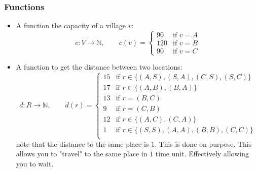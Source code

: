         \subsubsection{Functions}        
            \begin{itemize}
                \item 
                    A function the capacity of a village $v$:
                    \[
                        c : V \to \mathbb{N},\qquad c(v) = \begin{cases}
                            90  & \text{if } v = A \\
                            120 & \text{if } v = B \\
                            90  & \text{if } v = C
                        \end{cases}
                    \]
                \item 
                    A function to get the distance between two locations:
                    \[
                        d : R \to \mathbb{N},\qquad d(r) = \begin{cases}
                            15 & \text{if } r \in \big\{
                                (A, S), (S, A), (C, S), (S, C)
                            \big\} \\
                            17 & \text{if } r \in \big\{
                                (A, B), (B, A)
                            \big\}  \\
                            13 & \text{if } r = (B, C) \\
                            9 & \text{if } r = (C, B) \\
                            12 & \text{if } r \in \big\{
                                (A, C), (C, A)
                            \big\}  \\
                            1 & \text{if } r \in \big\{
                                (S, S), (A, A), (B, B), (C, C)
                            \big\} \\
                        \end{cases}
                    \]
                    note that the distance to the same place is $1$. This is
                    done on purpose. This allows you to "travel" to the same
                    place in $1$ time unit. Effectively allowing you to wait.
            \end{itemize}
    
